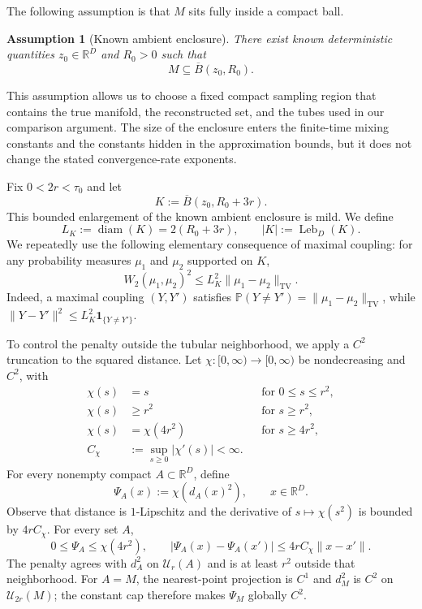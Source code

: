 \documentclass{article}
\newtheorem{assumption}{Assumption}
\newcommand{\R}{\mathbb R}
\newcommand{\Pp}{\mathbb P}
\newcommand{\diam}{\operatorname{diam}}
\newcommand{\TV}{\mathrm{TV}}
\newcommand{\Leb}{\operatorname{Leb}}
\newcommand{\cU}{\mathcal U}
\numberwithin{equation}{section}
\begin{document}
The following assumption is that $M$ sits fully inside a compact ball.
\begin{assumption}[Known ambient enclosure]
\label{ass:ambient-envelope}
There exist known deterministic quantities $z_0\in\R^D$ and $R_0>0$
such that
\[
    M\subseteq \overline B(z_0,R_0).
\]
\end{assumption}
This assumption allows us to choose a fixed compact sampling region that contains the true manifold, the reconstructed set, and the tubes used in our comparison argument. The size of the enclosure enters the finite-time mixing constants and the constants hidden in the approximation bounds, but it does not change the stated convergence-rate exponents.

Fix $0<2r<\tau_0$ and let
\[
 K:=\overline B(z_0,R_0+3r).
\]
This bounded enlargement of the known ambient enclosure is mild.
We define
\[
 L_K:=\diam(K)=2(R_0+3r),
  \qquad
  |K|:=\Leb_D(K).  
\]
We repeatedly use the following elementary consequence of maximal coupling:
for any probability measures $\mu_1$ and $\mu_2$ supported on $K$,
\begin{equation}
 W_2(\mu_1,\mu_2)^2
 \le L_K^2\lVert\mu_1-\mu_2\rVert_{\TV}.
\label{eq:w2-tv-coupling}
\end{equation}
Indeed, a maximal coupling $(Y,Y')$ satisfies
$\Pp(Y\ne Y')=\lVert\mu_1-\mu_2\rVert_{\TV}$, while
$\lVert Y-Y'\rVert^2\le L_K^2\mathbf1_{\{Y\ne Y'\}}$.


To control the penalty outside the tubular neighborhood, we apply a $C^2$
truncation to the squared distance. Let
$\chi:[0,\infty)\to[0,\infty)$ be nondecreasing and $C^2$, with
\begin{align}
  \chi(s)&=s &&\text{for }0\le s\le r^2,\label{eq:cap-inner}\\
  \chi(s)&\ge r^2 &&\text{for }s\ge r^2,\label{eq:cap-lower}\\
  \chi(s)&=\chi(4r^2) &&\text{for }s\ge4r^2,\label{eq:cap-outer}\\
  C_\chi&:=\sup_{s\ge0}|\chi'(s)|<\infty.
\label{eq:cap-lipschitz}
\end{align}
For every nonempty compact $A\subset\R^D$, define
\begin{equation}
  \Psi_A(x):=\chi(d_A(x)^2),\qquad x\in\R^D.
\label{eq:capped-penalty}
\end{equation}
Observe that distance is $1$-Lipschitz and the derivative of
$s\mapsto\chi(s^2)$ is bounded by $4rC_\chi$. For every set $A$,
\[
 0\le\Psi_A\le\chi(4r^2),
 \qquad
 |\Psi_A(x)-\Psi_A(x')|
 \le4rC_\chi\lVert x-x'\rVert.
\]
The penalty agrees with
$d_A^2$ on $\cU_r(A)$ and is at least $r^2$ outside that neighborhood.
For $A=M$, the nearest-point projection is $C^1$ and $d_M^2$ is $C^2$ on
$\cU_{2r}(M)$; the constant cap therefore makes $\Psi_M$ globally $C^2$.
\end{document}
